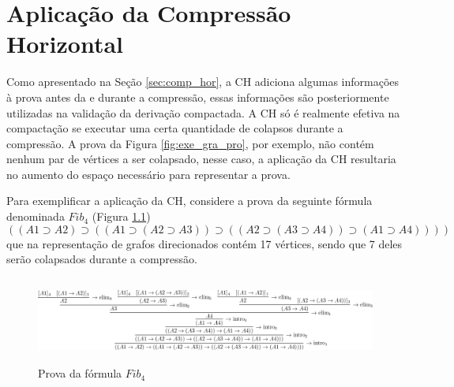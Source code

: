 
\chapter{Aplicação da Compressão Horizontal}
\label{cap:aplicacao_tec}

Como apresentado na Seção \ref{sec:comp_hor}, a CH adiciona algumas informações à prova antes da e durante a compressão, essas informações são posteriormente utilizadas na validação da derivação compactada. A CH só é realmente efetiva na compactação se executar uma certa quantidade de colapsos durante a compressão. A prova da Figura \ref{fig:exe_gra_pro}, por exemplo, não contém nenhum par de vértices a ser colapsado, nesse caso, a aplicação da CH resultaria no aumento do espaço necessário para representar a prova.

Para exemplificar a aplicação da CH, considere a prova da seguinte fórmula denominada $Fib_4$ (Figura \ref{fig:prova_fib_4}) $$((A1 \supset A2) \supset ((A1 \supset (A2 \supset A3)) \supset ((A2 \supset (A3 \supset A4)) \supset (A1 \supset A4))))$$ que na representação de grafos direcionados contém 17 vértices, sendo que 7 deles serão colapsados durante a compressão.

\begin{figure}[ht]
    \begin{center}
        \includegraphics[height=80pt,width=400pt]{images/prooftree0x.png}
    \caption{Prova da fórmula $Fib_{4}$}
    \label{fig:prova_fib_4}
    \end{center}
\end{figure}

